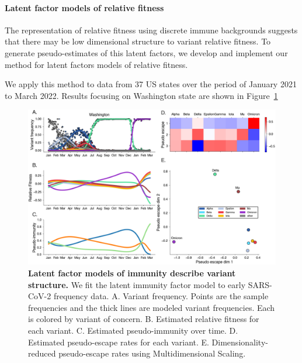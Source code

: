 \documentclass[12pt,oneside,letterpaper]{article}
\begin{document}

\paragraph{Latent factor models of relative fitness}

The representation of relative fitness using discrete immune backgrounds suggests that there may be low dimensional structure to variant relative fitness.
To generate pseudo-estimates of this latent factors, we develop and implement our method for latent factors models of relative fitness.

We apply this method to data from 37 US states over the period of January 2021 to March 2022. Results focusing on Washington state are shown in Figure~\ref{fig:latent_immune}

\begin{figure}[h]
    \centering
    \includegraphics[width=0.8\linewidth]{./figures/latent_immune.png}
    \caption{\textbf{Latent factor models of immunity describe variant structure.}
        We fit the latent immunity factor model to early SARS-CoV-2 frequency data.
        A. Variant frequency. Points are the sample frequencies and the thick lines are modeled variant frequencies. Each is colored by variant of concern.
        B. Estimated relative fitness for each variant.
        C. Estimated pseudo-immunity over time.
        D. Estimated pseudo-escape rates for each variant.
        E. Dimensionality-reduced pseudo-escape rates using Multidimensional Scaling.
    }
\label{fig:latent_immune}
\end{figure}

\end{document}
